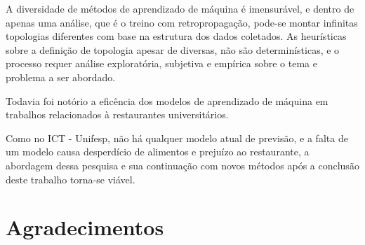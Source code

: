 \documentclass[	12pt, Times, openright, twoside, a4paper, english, brazil]{abntex2}
\begin{document}
         A diversidade de métodos de aprendizado de máquina é imensurável, e dentro de apenas uma análise, que é o treino com retropropagação, pode-se montar infinitas topologias diferentes com base na estrutura dos dados coletados. 
        As heurísticas sobre a definição de topologia apesar de diversas, não são determinísticas, e o processo requer análise exploratória, subjetiva e empírica sobre o tema e problema a ser abordado.
        
         Todavia foi notório a eficência dos modelos de aprendizado de máquina em trabalhos relacionados à restaurantes universitários. 
        
         Como no ICT - Unifesp, não há qualquer modelo atual de previsão, e a falta de um modelo causa desperdício de alimentos e prejuízo ao restaurante, a abordagem dessa pesquisa e sua continuação com novos métodos após a conclusão deste trabalho torna-se viável.
  \chapter{Agradecimentos}





\end{document}
